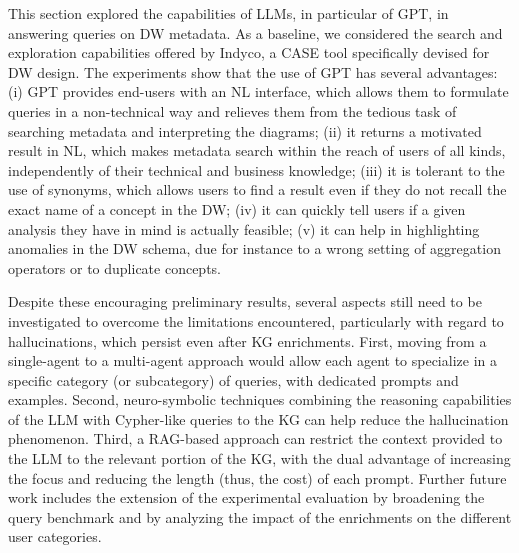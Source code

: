 This section explored the capabilities of LLMs, in particular of GPT, in answering queries on DW metadata. As a baseline, we considered the search and exploration capabilities offered by Indyco, a CASE tool specifically devised for DW design. The experiments show that the use of GPT has several advantages: (i) GPT provides end-users with an NL interface, which allows them to formulate queries in a non-technical way and relieves them from the tedious task of searching metadata and interpreting the diagrams; (ii) it returns a motivated result in NL, which makes metadata search within the reach of users of all kinds, independently of their technical and business knowledge; (iii) it is tolerant to the use of synonyms, which allows users to find a result even if they do not recall the exact name of a concept in the DW; (iv) it can quickly tell users if a given analysis they have in mind is actually feasible; (v) it can help in highlighting anomalies in the DW schema, due for instance to a wrong setting of aggregation operators or to duplicate concepts.

Despite these encouraging preliminary results, several aspects still need to be investigated to overcome the limitations encountered, particularly with regard to hallucinations, which persist even after KG enrichments. First, moving from a single-agent to a multi-agent approach would allow each agent to specialize in a specific category (or subcategory) of queries, with dedicated prompts and examples. Second, neuro-symbolic techniques combining the reasoning capabilities of the LLM with Cypher-like queries to the KG can help reduce the hallucination phenomenon. Third, a RAG-based approach can restrict the context provided to the LLM to the relevant portion of the KG, with the dual advantage of increasing the focus and reducing the length (thus, the cost) of each prompt. Further future work includes the extension of the experimental evaluation by broadening the query benchmark and by analyzing the impact of the enrichments on the different user categories.
